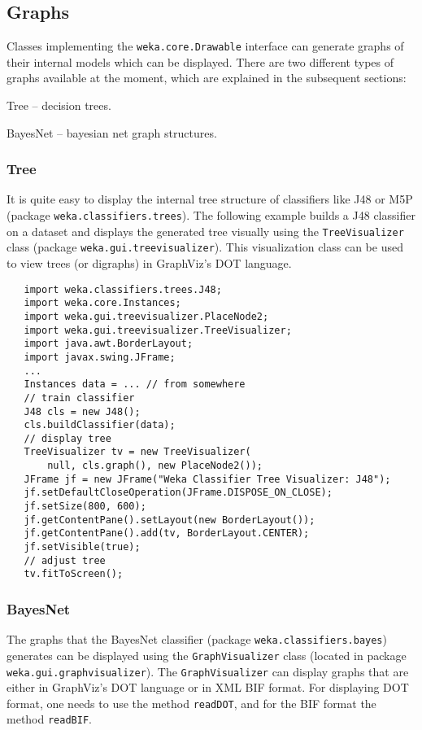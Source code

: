 \newpage

\subsection{Graphs}
Classes implementing the \texttt{weka.core.Drawable} interface can generate
graphs of their internal models which can be displayed. There are two
different types of graphs available at the moment, which are explained in the
subsequent sections:
\begin{tight_itemize}
	\item Tree -- decision trees.
	\item BayesNet -- bayesian net graph structures.
\end{tight_itemize}

\subsubsection{Tree}
It is quite easy to display the internal tree structure of classifiers like
J48 or M5P (package \texttt{weka.classifiers.trees}). The following example
builds a J48 classifier on a dataset and displays the generated tree visually
using the \texttt{TreeVisualizer} class (package \texttt{weka.gui.treevisualizer}).
This visualization class can be used to view trees (or digraphs) in GraphViz's DOT
language\cite{dotformat}.
\begin{verbatim}
   import weka.classifiers.trees.J48;
   import weka.core.Instances;
   import weka.gui.treevisualizer.PlaceNode2;
   import weka.gui.treevisualizer.TreeVisualizer;
   import java.awt.BorderLayout;
   import javax.swing.JFrame;
   ...
   Instances data = ... // from somewhere
   // train classifier
   J48 cls = new J48();
   cls.buildClassifier(data);
   // display tree
   TreeVisualizer tv = new TreeVisualizer(
       null, cls.graph(), new PlaceNode2());
   JFrame jf = new JFrame("Weka Classifier Tree Visualizer: J48");
   jf.setDefaultCloseOperation(JFrame.DISPOSE_ON_CLOSE);
   jf.setSize(800, 600);
   jf.getContentPane().setLayout(new BorderLayout());
   jf.getContentPane().add(tv, BorderLayout.CENTER);
   jf.setVisible(true);
   // adjust tree
   tv.fitToScreen();
\end{verbatim}

\newpage

\subsubsection{BayesNet}
The graphs that the BayesNet classifier (package \texttt{weka.classifiers.bayes})
generates can be displayed using the \texttt{GraphVisualizer} class
(located in package \texttt{weka.gui.graphvisualizer}). The \texttt{GraphVisualizer} can
display graphs that are either in GraphViz's DOT language\cite{dotformat} or in
XML BIF\cite{cozman} format. For displaying DOT format, one needs to use the
method \texttt{readDOT}, and for the BIF format the method \texttt{readBIF}.

